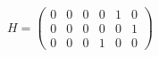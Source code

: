 \[
H = \begin{pmatrix}
    0 & 0 & 0 & 0 & 1 & 0\\
    0 & 0 & 0 & 0 & 0 & 1\\
    0 & 0 & 0 & 1 & 0 & 0
\end{pmatrix}
\]
